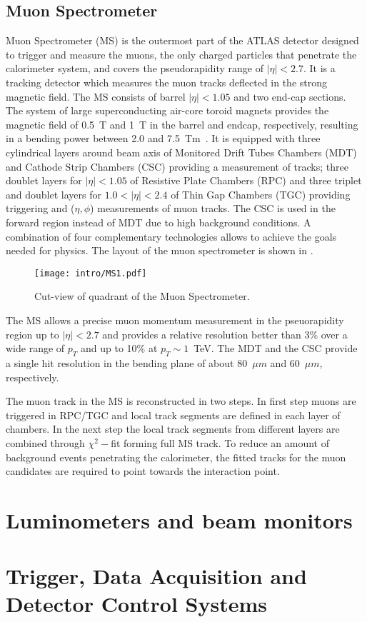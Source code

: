 \subsection{Muon Spectrometer}

Muon Spectrometer (MS) is the outermost part of the ATLAS detector designed to trigger and measure the muons, the only charged particles that penetrate the calorimeter system, and covers the pseudorapidity range of $|\eta|<2.7$. It is a tracking detector which measures the muon tracks deflected in the strong magnetic field. The MS consists of barrel $|\eta|<1.05$ and two end-cap sections.  The system of large superconducting air-core toroid magnets provides the magnetic field of 0.5~T and 1~T in the barrel and endcap, respectively, resulting in a bending power between 2.0 and 7.5~Tm~\cite{MCPrun1}. It is equipped with three cylindrical layers around beam axis of Monitored Drift Tubes Chambers (MDT) and Cathode Strip Chambers (CSC) providing a measurement of tracks; three doublet layers for $|\eta|<1.05$ of Resistive Plate Chambers (RPC) and three triplet and doublet layers for $1.0 < |\eta| < 2.4$ of Thin Gap Chambers (TGC) providing triggering and ($\eta, \phi$) measurements of muon tracks.
The CSC is used in the forward region instead of MDT due to high background conditions.
A combination of four complementary technologies allows to achieve the goals needed for physics. The layout of the muon spectrometer is shown in .

\begin{figure}[h!]
\centering
 \texttt{[image: intro/MS1.pdf]}
 \caption{Cut-view of quadrant of the Muon Spectrometer.}
\label{fig:MS}
\end{figure}

The MS allows a precise muon momentum measurement in the pseuorapidity region up to $|\eta|<2.7$ and provides a relative resolution better than 3\% over a wide range of $p_T$ and up to 10\% at $p_T\sim 1$~TeV.
The MDT and the CSC provide a single hit resolution in the bending plane of about 80~$\mu m$ and 60~$\mu m$, respectively.

The muon track in the MS is reconstructed in two steps. In first step muons are triggered in RPC/TGC and local track segments are defined in each layer of chambers. In the next step the local track segments from different layers are combined through $\chi^2-$fit forming full MS track. To reduce an amount of background events penetrating the calorimeter, the fitted tracks for the muon candidates are required to point towards the interaction point.

\section{Luminometers and beam monitors}
\section{Trigger, Data Acquisition and Detector Control Systems}

